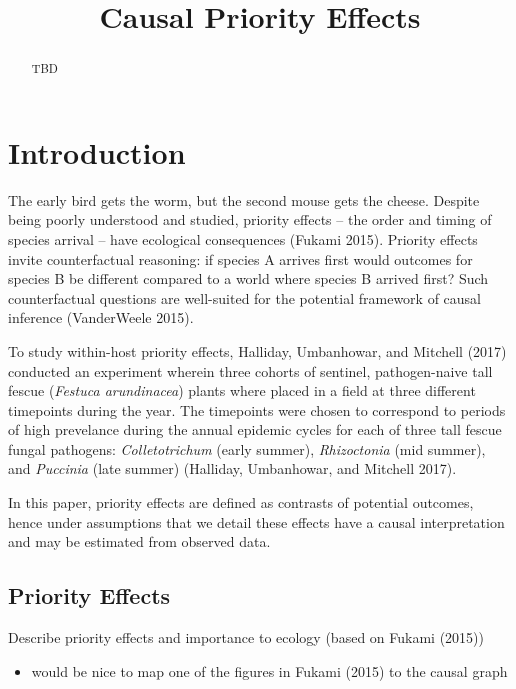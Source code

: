 \documentclass[]{article}
\title{Causal Priority Effects}
\author{}
\date{}
\providecommand{\tightlist}{%
  \setlength{\itemsep}{0pt}\setlength{\parskip}{0pt}}
\begin{document}
\maketitle
\begin{abstract}
TBD
\end{abstract}

\doublespacing

\hypertarget{introduction}{%
\section{Introduction}\label{introduction}}

The early bird gets the worm, but the second mouse gets the cheese.
Despite being poorly understood and studied, priority effects -- the
order and timing of species arrival -- have ecological consequences
(Fukami 2015). Priority effects invite counterfactual reasoning: if
species A arrives first would outcomes for species B be different
compared to a world where species B arrived first? Such counterfactual
questions are well-suited for the potential framework of causal
inference (VanderWeele 2015).

To study within-host priority effects, Halliday, Umbanhowar, and
Mitchell (2017) conducted an experiment wherein three cohorts of
sentinel, pathogen-naive tall fescue (\emph{Festuca arundinacea}) plants
where placed in a field at three different timepoints during the year.
The timepoints were chosen to correspond to periods of high prevelance
during the annual epidemic cycles for each of three tall fescue fungal
pathogens: \emph{Colletotrichum} (early summer), \emph{Rhizoctonia} (mid
summer), and \emph{Puccinia} (late summer) (Halliday, Umbanhowar, and
Mitchell 2017).

In this paper, priority effects are defined as contrasts of potential
outcomes, hence under assumptions that we detail these effects have a
causal interpretation and may be estimated from observed data.

\hypertarget{priority-effects}{%
\subsection{Priority Effects}\label{priority-effects}}

Describe priority effects and importance to ecology (based on Fukami
(2015))

\begin{itemize}
\tightlist
\item
  would be nice to map one of the figures in Fukami (2015) to the causal
  graph
\end{itemize}
\end{document}
